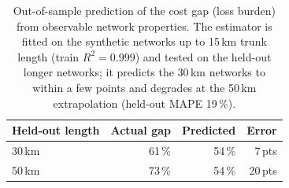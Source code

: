 \documentclass[11pt,a4paper]{article}
\begin{document}
\begin{table}[t]
\centering
\caption{Out-of-sample prediction of the cost gap (loss burden) from observable network
properties. The estimator is fitted on the synthetic networks up to 15\,km trunk length
(train $R^2=0.999$) and tested on the held-out longer networks; it predicts the 30\,km
networks to within a few points and degrades at the 50\,km extrapolation (held-out MAPE
19\,\%).}
\label{tab:prediction}
\begin{tabular}{lrrr}
\hline
Held-out length & Actual gap & Predicted & Error \\
\hline
30\,km & 61\,\% & 54\,\% & 7\,pts \\
50\,km & 73\,\% & 54\,\% & 20\,pts \\
\hline
\end{tabular}
\end{table}
\end{document}
